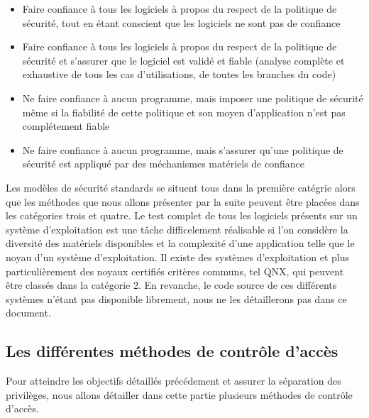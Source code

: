 \begin{itemize}
  \item Faire confiance à tous les logiciels à propos du respect de la politique de sécurité, tout en étant conscient que les logiciels ne sont pas de confiance %
  \item Faire confiance à tous les logiciels à propos du respect de la politique de sécurité et s'assurer que le logiciel est validé et fiable (analyse complète et exhaustive de tous les cas d'utilisations, de toutes les branches du code) %
  \item Ne faire confiance à aucun programme, mais imposer une politique de sécurité même si la fiabilité de cette politique et son moyen d'application n'est pas complétement fiable%
  \item Ne faire confiance à aucun programme, mais s'assurer qu'une politique de sécurité est appliqué par des méchanismes matériels de confiance%
\end{itemize}

Les modèles de sécurité standards se situent tous dans la première catégrie alors que les méthodes que nous allons présenter par la suite peuvent être placées dans les catégories trois et quatre. Le test complet de tous les logiciels présents sur un système d'exploitation est une tâche difficelement réalisable si l'on considère la diversité des matériels disponibles et la complexité d'une application telle que le noyau d'un système d'exploitation. Il existe des systèmes d'exploitation et plus particulièrement des noyaux certifiés critères communs, tel QNX\cite{QNX}, qui peuvent être classés dans la catégorie 2. En revanche, le code source de ces différents systèmes n'étant pas disponible librement, nous ne les détaillerons pas dans ce document.

\subsection{Les différentes méthodes de contrôle d'accès}

Pour atteindre les objectifs détaillés précédement et assurer la séparation des privilèges, nous allons détailler dans cette partie plusieurs méthodes de contrôle d'accès.

